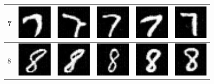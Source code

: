 \begin{table}[H]
\begin{tabular}{|llllll|}
7 & \includegraphics[width=1.69cm, height=1.69cm]{Files/MNIST/0-7.png}  &\includegraphics[width=1.69cm, height=1.69cm]{Files/MNIST/2-1.png}   & \includegraphics[width=1.69cm, height=1.69cm]{Files/MNIST/3-3.png}  & \includegraphics[width=1.69cm, height=1.69cm]{Files/MNIST/4-5.png}  & \includegraphics[width=1.69cm, height=1.69cm]{Files/MNIST/5-7.png} \\ \hline

8 & \includegraphics[width=1.69cm, height=1.69cm]{Files/MNIST/1-0.png}  &\includegraphics[width=1.69cm, height=1.69cm]{Files/MNIST/2-2.png}   & \includegraphics[width=1.69cm, height=1.69cm]{Files/MNIST/3-4.png}  & \includegraphics[width=1.69cm, height=1.69cm]{Files/MNIST/4-6.png}  & \includegraphics[width=1.69cm, height=1.69cm]{Files/MNIST/7-2.png} \\ \hline


\end{tabular}
\end{table}

